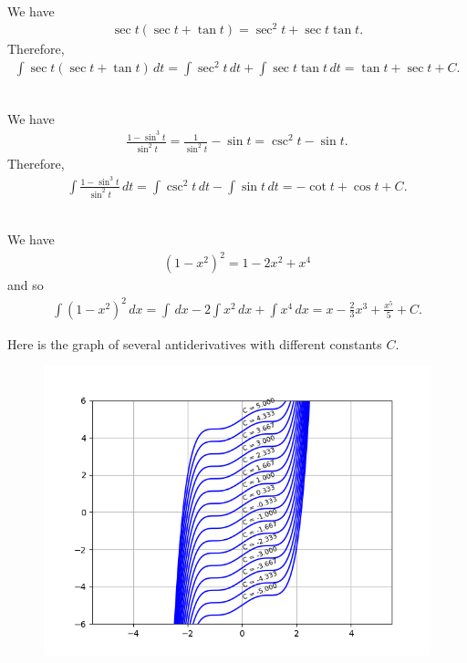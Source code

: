 	\spc
	
	\\
	We have
		\begin{align*}
		\sec t (\sec t + \tan t) = \sec^2 t + \sec t \tan t .
		\end{align*}	
	Therefore,
		\begin{align*}
		\int \sec t (\sec t + \tan t) \, dt = \int \sec^2 t \, dt + \int \sec t \tan t \, dt = \tan t + \sec t + C .
		\end{align*}	
		
	\spc
	
	\\
	We have
		\begin{align*}
		\frac{1 - \sin^3 t}{\sin^2 t} = \frac{1}{\sin^2 t} - \sin t = \csc^2 t - \sin t .
		\end{align*}	
	Therefore,
		\begin{align*}
		\int \frac{1 - \sin^3 t}{\sin^2 t} \, dt = \int \csc^2 t \, dt - \int \sin t \, dt = -\cot t + \cos t + C .
\end{align*}	

	\spc
	
	\\
	We have
		\begin{align*}
		(1 - x^2)^2 = 1 - 2x^2 + x^4
		\end{align*}
	and so
		\begin{align*}
		\int (1 - x^2)^2 \, dx = \int \, dx - 2 \int x^2 \, dx + \int x^4 \, dx = x - \frac{2}{3} x^3 + \frac{x^5}{5} + C .
		\end{align*}
	
	Here is the graph of several antiderivatives with different constants $C$.
	
		\begin{figure}[h]
		\centering
		\includegraphics[scale=0.68]{exo18.png}
		\end{figure}
		
